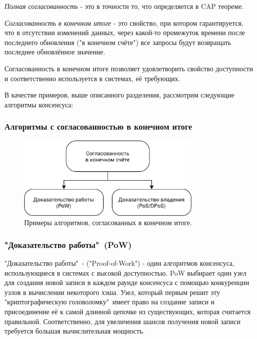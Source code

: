\documentclass[subf, href, colorlinks=true, 14pt,
times, mtpro, specialist]{disser}
\theoremstyle{definition}
\begin{document}
\emph{Полная согласованность} - это в точности то, что определяется в CAP теореме.

\emph{Согласованность в конечном итоге} - это свойство, при котором гарантируется, что в отсутствии изменений данных, через какой-то промежуток времени после последнего обновления ("в конечном счёте") все запросы будут возвращать последнее обновлённое значение.

Согласованность в конечном итоге позволяет удовлетворить свойство доступности и соответственно используется в системах, её требующих.

В качестве примеров, выше описанного разделения, рассмотрим следующие алгоритмы консенсуса:

\subsubsection{Алгоритмы с согласованностью в конечном итоге}

\begin{figure}[H]
\centering
\includegraphics[width=0.8\textwidth]{src/pics/consensus_types_2.png}
\caption{Примеры алгоритмов, согласованных в конечном итоге.}
\label{fig:consensus_types_2}
\end{figure}


\subsubsection{"Доказательство работы"\ (PoW)}

"Доказательство работы"\ - ("Proof-of-Work") - один алгоритмов консенсуса, использующиеся в системах с высокой доступностью. PoW выбирает один узел для создания новой записи в каждом раунде консенсуса с помощью конкуренции узлов в вычислении некоторого хэша. Узел, который первым решит эту "криптографическую головоломку"\, имеет право на создание записи и присоединение её к самой длинной цепочке из существующих, которая считается правильной. Соответственно, для увеличения шансов получения новой записи требуется большая вычислительная мощность. 
\end{document}
